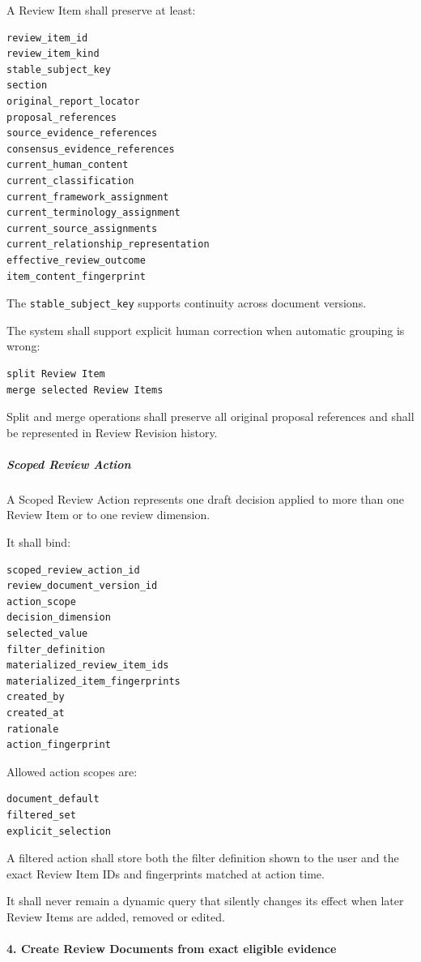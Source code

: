 A Review Item shall preserve at least:

\begin{verbatim}
review_item_id
review_item_kind
stable_subject_key
section
original_report_locator
proposal_references
source_evidence_references
consensus_evidence_references
current_human_content
current_classification
current_framework_assignment
current_terminology_assignment
current_source_assignments
current_relationship_representation
effective_review_outcome
item_content_fingerprint
\end{verbatim}

The \texttt{stable\_subject\_key} supports continuity across document versions.

The system shall support explicit human correction when automatic grouping is wrong:

\begin{verbatim}
split Review Item
merge selected Review Items
\end{verbatim}

Split and merge operations shall preserve all original proposal references and shall be represented in Review Revision history.

\hypertarget{scoped-review-action}{%
\subparagraph{Scoped Review Action}\label{scoped-review-action}}

A Scoped Review Action represents one draft decision applied to more than one Review Item or to one review dimension.

It shall bind:

\begin{verbatim}
scoped_review_action_id
review_document_version_id
action_scope
decision_dimension
selected_value
filter_definition
materialized_review_item_ids
materialized_item_fingerprints
created_by
created_at
rationale
action_fingerprint
\end{verbatim}

Allowed action scopes are:

\begin{verbatim}
document_default
filtered_set
explicit_selection
\end{verbatim}

A filtered action shall store both the filter definition shown to the user and the exact Review Item IDs and fingerprints matched at action time.

It shall never remain a dynamic query that silently changes its effect when later Review Items are added, removed or edited.

\hypertarget{4-create-review-documents-from-exact-eligible-evidence}{%
\paragraph{4. Create Review Documents from exact eligible evidence}\label{4-create-review-documents-from-exact-eligible-evidence}}

